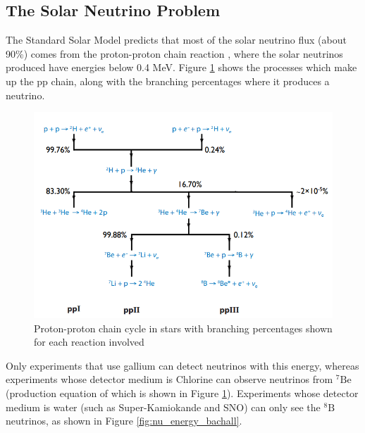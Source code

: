 \subsection{The Solar Neutrino Problem}

The Standard Solar Model predicts that most of the solar neutrino flux (about 90\%) comes from the proton-proton chain reaction \cite{borexino2018comprehensive}, where the solar neutrinos produced have energies below 0.4 MeV. Figure \ref{fig:ppchain} shows the processes which make up the pp chain, along with the branching percentages where it produces a neutrino. 

\begin{figure}
    \centering
    \includegraphics[width=\textwidth]{Figures/ppchain.png}
    \caption{Proton-proton chain cycle in stars with branching percentages shown for each reaction involved }
    \label{fig:ppchain}
\end{figure}

Only experiments that use gallium can detect neutrinos with this energy, whereas experiments whose detector medium is Chlorine can observe neutrinos from ${ }^{7} \mathrm{Be}$ (production equation of which is shown in Figure \ref{fig:ppchain}). Experiments whose detector medium is water (such as Super-Kamiokande and SNO) can only see the ${ }^{8} \mathrm{B}$ neutrinos, as shown in Figure \ref{fig:nu_energy_bachall}.

